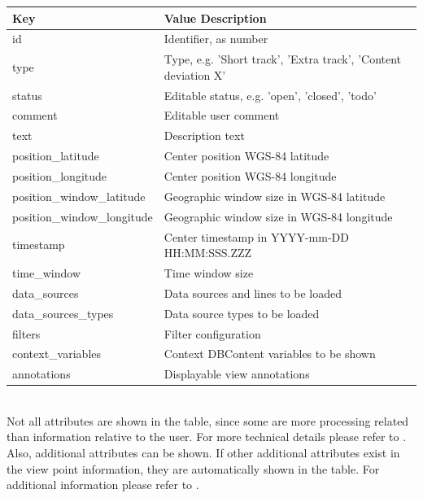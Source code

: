 \begin{center}
 \begin{table}[H]
  \begin{tabularx}{\textwidth}{ | l | X | }
    \hline
    \textbf{Key} & \textbf{Value Description} \\ \hline
    id & Identifier, as number \\ \hline
    type & Type, e.g. 'Short track', 'Extra track', 'Content deviation X'  \\ \hline
    status & Editable status, e.g. 'open', 'closed', 'todo' \\ \hline
    comment & Editable user comment \\ \hline
    text & Description text \\ \hline
    position\_latitude & Center position WGS-84 latitude \\ \hline
    position\_longitude & Center position WGS-84 longitude \\ \hline
    position\_window\_latitude & Geographic window size in WGS-84 latitude  \\ \hline
    position\_window\_longitude & Geographic window size in WGS-84 longitude  \\ \hline
    timestamp & Center timestamp in YYYY-mm-DD HH:MM:SSS.ZZZ  \\ \hline
    time\_window & Time window size \\ \hline
    data\_sources & Data sources and lines to be loaded \\ \hline
    data\_sources\_types & Data source types to be loaded \\ \hline
    filters & Filter configuration \\ \hline
    context\_variables & Context DBContent variables to be shown \\ \hline
    annotations & Displayable view annotations \\ \hline
\end{tabularx}
\end{table}
\end{center}
\ \\

Not all attributes are shown in the table, since some are more processing related than information relative to the user. For more technical details please refer to . \\

Also, additional attributes can be shown. If other additional attributes exist in the view point information, they are automatically shown in the table. For additional information please refer to . \\

